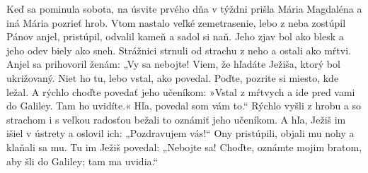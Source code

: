 Keď sa pominula sobota, na úsvite prvého dňa v týždni prišla Mária Magdaléna a iná Mária pozrieť hrob. Vtom nastalo veľké zemetrasenie, lebo z neba zostúpil Pánov anjel, pristúpil, odvalil kameň a sadol si naň. Jeho zjav bol ako blesk a jeho odev biely ako sneh. Strážnici strnuli od strachu z neho a ostali ako mŕtvi. 
\versseparator
Anjel sa prihovoril ženám: „Vy sa nebojte! Viem, že hľadáte Ježiša, ktorý bol ukrižovaný. Niet ho tu, lebo vstal, ako povedal. Poďte, pozrite si miesto, kde ležal. A rýchlo choďte povedať jeho učeníkom: »Vstal z mŕtvych a ide pred vami do Galiley. Tam ho uvidíte.« Hľa, povedal som vám to.“ 
\versseparator
Rýchlo vyšli z hrobu a so strachom i s veľkou radosťou bežali to oznámiť jeho učeníkom.
\versseparator
A hľa, Ježiš im išiel v ústrety a oslovil ich: „Pozdravujem vás!“ Ony pristúpili, objali mu nohy a klaňali sa mu. Tu im Ježiš povedal: „Nebojte sa! Choďte, oznámte mojim bratom, aby šli do Galiley; tam ma uvidia.“ 